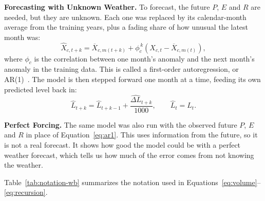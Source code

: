 \documentclass{article}
\begin{document}
\textbf{Forecasting with Unknown Weather.} To forecast, the future $P$, $E$ and $R$ are needed,
but they are unknown. Each one was replaced by its calendar-month average from the training
years, plus a fading share of how unusual the latest month was:
\begin{equation}
\hat X_{c,t+k} = \overline{X}_{c,m(t+k)} + \phi_c^{\,k}\left(X_{c,t} - \overline{X}_{c,m(t)}
\right), \label{eq:ar1}
\end{equation}
where $\phi_c$ is the correlation between one month's anomaly and the next month's anomaly in the
training data. This is called a first-order autoregression, or AR(1)~\cite{fpp3}. The model is then stepped
forward one month at a time, feeding its own predicted level back in:
\begin{equation}
\hat L_{t+k} = \hat L_{t+k-1} + \frac{\widehat{\Delta L}_{t+k}}{1000}, \qquad \hat L_t = L_t.
\label{eq:recursion}
\end{equation}

\textbf{Perfect Forcing.} The same model was also run with the observed future $P$, $E$ and $R$
in place of Equation~\ref{eq:ar1}. This uses information from the future, so it is not a real
forecast. It shows how good the model could be with a perfect weather forecast, which tells us
how much of the error comes from not knowing the weather.

Table~\ref{tab:notation-wb} summarizes the notation used in
Equations~\ref{eq:volume}--\ref{eq:recursion}.
\end{document}

